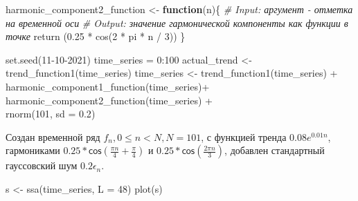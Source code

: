 \documentclass[specialist,
               substylefile = spbu_report.rtx,
               subf,href,colorlinks=true, 12pt]{disser}
\theoremstyle{definition}
\newenvironment{Shaded}{\begin{snugshade}}{\end{snugshade}}
\newcommand{\AttributeTok}[1]{\textcolor[rgb]{0.77,0.63,0.00}{#1}}
\newcommand{\CommentTok}[1]{\textcolor[rgb]{0.56,0.35,0.01}{\textit{#1}}}
\newcommand{\ControlFlowTok}[1]{\textcolor[rgb]{0.13,0.29,0.53}{\textbf{#1}}}
\newcommand{\DecValTok}[1]{\textcolor[rgb]{0.00,0.00,0.81}{#1}}
\newcommand{\FloatTok}[1]{\textcolor[rgb]{0.00,0.00,0.81}{#1}}
\newcommand{\FunctionTok}[1]{\textcolor[rgb]{0.00,0.00,0.00}{#1}}
\newcommand{\NormalTok}[1]{#1}
\newcommand{\OtherTok}[1]{\textcolor[rgb]{0.56,0.35,0.01}{#1}}
\newcommand{\SpecialCharTok}[1]{\textcolor[rgb]{0.00,0.00,0.00}{#1}}
\begin{document}
\begin{Shaded}
\begin{Highlighting}[]
\NormalTok{  harmonic\_component2\_function }\OtherTok{\textless{}{-}} \ControlFlowTok{function}\NormalTok{(n)\{}
    \CommentTok{\# Input: аргумент {-} отметка на временной оси}
    \CommentTok{\# Output: значение гармонической компоненты как функции в точке}
    \FunctionTok{return}\NormalTok{ (}\FloatTok{0.25} \SpecialCharTok{*} \FunctionTok{cos}\NormalTok{(}\DecValTok{2} \SpecialCharTok{*}\NormalTok{ pi }\SpecialCharTok{*}\NormalTok{ n }\SpecialCharTok{/} \DecValTok{3}\NormalTok{))}
\NormalTok{  \}}
\end{Highlighting}
\end{Shaded}

\begin{Shaded}
\begin{Highlighting}[]
  \FunctionTok{set.seed}\NormalTok{(}\DecValTok{11{-}10{-}2021}\NormalTok{)}
\NormalTok{  time\_series }\OtherTok{=} \DecValTok{0}\SpecialCharTok{:}\DecValTok{100}
\NormalTok{  actual\_trend }\OtherTok{\textless{}{-}} \FunctionTok{trend\_function1}\NormalTok{(time\_series)}
\NormalTok{  time\_series }\OtherTok{\textless{}{-}} \FunctionTok{trend\_function1}\NormalTok{(time\_series) }\SpecialCharTok{+}
\\ \FunctionTok{harmonic\_component1\_function}\NormalTok{(time\_series)}\SpecialCharTok{+}
\\ \FunctionTok{harmonic\_component2\_function}\NormalTok{(time\_series) }\SpecialCharTok{+} 
\\ \FunctionTok{rnorm}\NormalTok{(}\DecValTok{101}\NormalTok{, }\AttributeTok{sd =} \FloatTok{0.2}\NormalTok{)}
\end{Highlighting}
\end{Shaded}

Создан временной ряд \(f_n , 0\leqslant n < N, N=101\), с функцией
тренда \(0.08e^{0.01n}\), гармониками
\(0.25 * \mathsf{cos}(\frac{\pi n}{4} + \frac{\pi}{4})\) и
\(0.25 * \mathsf{cos}(\frac{2 \pi n}{3})\), добавлен стандартный гауссовский шум
\(0.2 \epsilon_n\).

\begin{Shaded}
\begin{Highlighting}[]
\NormalTok{  s }\OtherTok{\textless{}{-}} \FunctionTok{ssa}\NormalTok{(time\_series, }\AttributeTok{L =} \DecValTok{48}\NormalTok{)}
  \FunctionTok{plot}\NormalTok{(s)}
\end{Highlighting}
\end{Shaded}
\end{document}
